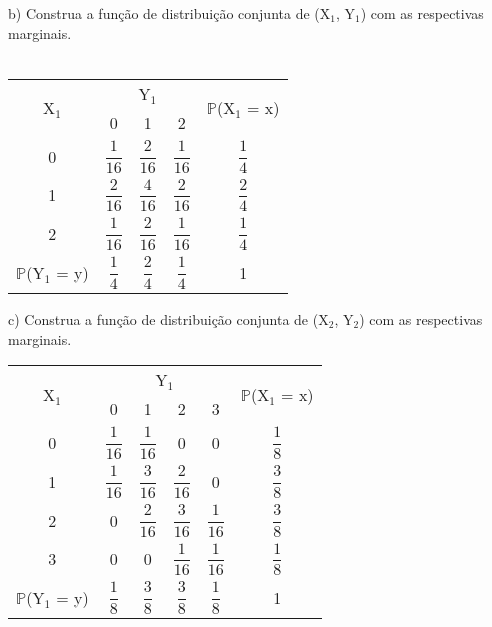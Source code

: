 \documentclass[12pt,a4paper,draft]{article}
\begin{document}
	\vspace{1cm}
	b) Construa a função de distribuição conjunta de (X$_{1}$, Y$_{1}$) com as respectivas marginais.\\
	\vspace{1cm}\\
	\begin{center}
		\begin{tabular}{ccccc}\midrule
			\multirow{2}{*}{X$_{1}$} & \multicolumn{3}{c}{Y$_{1}$} & \multirow{2}{*}{$\mathbb{P}$(X$_{1}$ = x)}\\ \cmidrule{2-4}
			& 0 & 1 & 2 & \\ \midrule
			0 & $\dfrac{1}{16}$ & $\dfrac{2}{16}$ & $\dfrac{1}{16}$ & $\dfrac{1}{4}$\\ \midrule
			1 & $\dfrac{2}{16}$ & $\dfrac{4}{16}$ & $\dfrac{2}{16}$ & $\dfrac{2}{4}$\\ \midrule
			2 & $\dfrac{1}{16}$ & $\dfrac{2}{16}$ & $\dfrac{1}{16}$ & $\dfrac{1}{4}$\\ \midrule
			$\mathbb{P}$(Y$_{1}$ = y) & $\dfrac{1}{4}$ & $\dfrac{2}{4}$ & $\dfrac{1}{4}$ & 1\\ \midrule
		\end{tabular}
	\end{center}
	\vspace{1cm}
	c) Construa a função de distribuição conjunta de (X$_{2}$, Y$_{2}$) com as respectivas marginais.
	\vspace{1cm}\\
	\begin{center}
		\begin{tabular}{cccccc}\midrule
			\multirow{2}{*}{X$_{1}$} & \multicolumn{4}{c}{Y$_{1}$} & \multirow{2}{*}{$\mathbb{P}$(X$_{1}$ = x)}\\ \cmidrule{2-5}
			& 0 & 1 & 2 & 3 & \\ \midrule
			0 & $\dfrac{1}{16}$ & $\dfrac{1}{16}$ & 0 & 0 & $\dfrac{1}{8}$\\ \midrule
			1 & $\dfrac{1}{16}$ & $\dfrac{3}{16}$ & $\dfrac{2}{16}$ & 0 & $\dfrac{3}{8}$\\ \midrule
			2 & 0 & $\dfrac{2}{16}$ & $\dfrac{3}{16}$ & $\dfrac{1}{16}$ & $\dfrac{3}{8}$\\ \midrule
			3 & 0 & 0 & $\dfrac{1}{16}$ & $\dfrac{1}{16}$ & $\dfrac{1}{8}$\\ \midrule
			$\mathbb{P}$(Y$_{1}$ = y) & $\dfrac{1}{8}$ & $\dfrac{3}{8}$ & $\dfrac{3}{8}$ & $\dfrac{1}{8}$ & 1\\ \midrule
		\end{tabular}
	\end{center}
\end{document}
